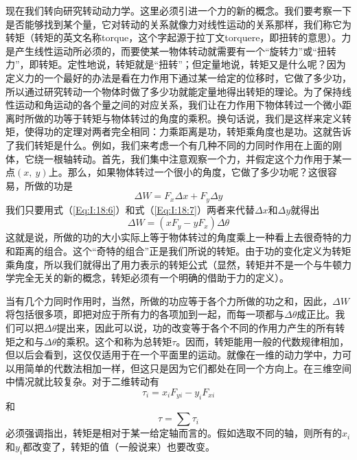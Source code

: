 现在我们转向研究转动动力学。这里必须引进一个力的新的概念。我们要考察一下是否能够找到某个量，它对转动的关系就像力对线性运动的关系那样，我们称它为转矩（转矩的英文名称torque，这个字起源于拉丁文torquere，即扭转的意思）。力是产生线性运动所必须的，而要使某一物体转动就需要有一个“旋转力”或“扭转力”，即转矩。定性地说，转矩就是“扭转”；但定量地说，转矩又是什么呢？因为定义力的一个最好的办法是看在力作用下通过某一给定的位移时，它做了多少功，所以通过研究转动一个物体时做了多少功就能定量地得出转矩的理论。为了保持线性运动和角运动的各个量之间的对应关系，我们让在力作用下物体转过一个微小距离时所做的功等于转矩与物体转过的角度的乘积。换句话说，我们是这样来定义转矩，使得功的定理对两者完全相同：力乘距离是功，转矩乘角度也是功。这就告诉了我们转矩是什么。例如，我们来考虑一个有几种不同的力同时作用在上面的刚体，它绕一根轴转动。首先，我们集中注意观察一个力，并假定这个力作用于某一点$(x,~y)$上。那么，如果物体转过一个很小的角度，它做了多少功呢？这很容易，所做的功是
\begin{equation}
    \label{Eq:I:18:10}
    \Delta W = F_x \Delta x + F_y \Delta y
\end{equation}
我们只要用式（\ref{Eq:I:18:6}）和式（\ref{Eq:I:18:7}）两者来代替$\Delta x$和$\Delta y$就得出
\begin{equation}
    \label{Eq:I:18:11}
    \Delta W = (xF_y - yF_x) \Delta \theta
\end{equation}
这就是说，所做的功的大小实际上等于物体转过的角度乘上一种看上去很奇特的力和距离的组合。这个“奇特的组合”正是我们所说的转矩。由于功的变化定义为转矩乘角度，所以我们就得出了用力表示的转矩公式（显然，转矩并不是一个与牛顿力学完全无关的新的概念，转矩必须有一个明确的借助于力的定义）。

当有几个力同时作用时，当然，所做的功应等于各个力所做的功之和，因此，$\Delta W$将包括很多项，即把对应于所有力的各项加到一起，而每一项都与$\Delta \theta$成正比。我们可以把$\Delta \theta$提出来，因此可以说，功的改变等于各个不同的作用力产生的所有转矩之和与$\Delta \theta$的乘积。这个和称为总转矩$\tau$。因而，转矩能用一般的代数规律相加，但以后会看到，这仅仅适用于在一个平面里的运动。就像在一维的动力学中，力可以用简单的代数法相加一样，但这只是因为它们都处在同一个方向上。在三维空间中情况就比较复杂。对于二维转动有
\begin{equation}
    \label{Eq:I:18:12}
    \tau_i = x_iF_{yi} - y_iF_{xi}
\end{equation}
和
\begin{equation}
    \label{Eq:I:18:13}
    \tau = \sum \tau_i
\end{equation}
必须强调指出，转矩是相对于某一给定轴而言的。假如选取不同的轴，则所有的$x_i$和$y_i$都改变了，转矩的值（一般说来）也要改变。

